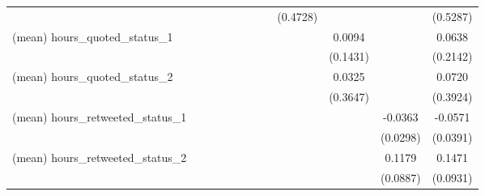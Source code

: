{\begin{tabular}{l*{11}{c}}
                    &                     &                     &                     &                     &                     &                     &                     &    (0.4728)         &                     &                     &    (0.5287)         \\
(mean) hours\_quoted\_status\_1&                     &                     &                     &                     &                     &                     &                     &                     &      0.0094         &                     &      0.0638         \\
                    &                     &                     &                     &                     &                     &                     &                     &                     &    (0.1431)         &                     &    (0.2142)         \\
(mean) hours\_quoted\_status\_2&                     &                     &                     &                     &                     &                     &                     &                     &      0.0325         &                     &      0.0720         \\
                    &                     &                     &                     &                     &                     &                     &                     &                     &    (0.3647)         &                     &    (0.3924)         \\
(mean) hours\_retweeted\_status\_1&                     &                     &                     &                     &                     &                     &                     &                     &                     &     -0.0363         &     -0.0571         \\
                    &                     &                     &                     &                     &                     &                     &                     &                     &                     &    (0.0298)         &    (0.0391)         \\
(mean) hours\_retweeted\_status\_2&                     &                     &                     &                     &                     &                     &                     &                     &                     &      0.1179         &      0.1471         \\
                    &                     &                     &                     &                     &                     &                     &                     &                     &                     &    (0.0887)         &    (0.0931)         \\

\end{tabular}}
